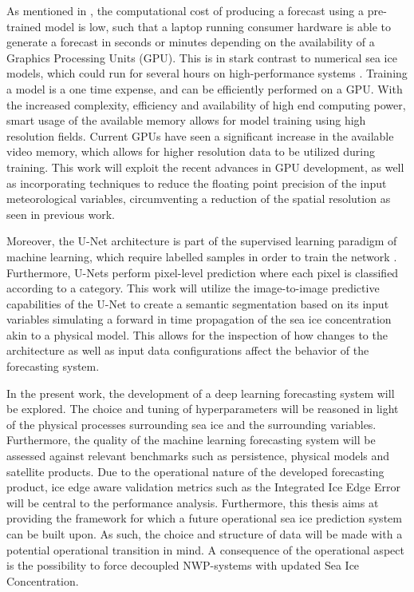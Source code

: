 \documentclass[../main/thesis.tex]{subfiles}
\begin{document}
As mentioned in \cite{Andersson2021, Fritzner2020}, the computational cost of producing a forecast using a pre-trained model is low, such that a laptop running consumer hardware is able to generate a forecast in seconds or minutes depending on the availability of a Graphics Processing Units (GPU). This is in stark contrast to numerical sea ice models, which could run for several hours on high-performance systems \cite{Andersson2021}. Training a model is a one time expense, and can be efficiently performed on a GPU. With the increased complexity, efficiency and availability of high end computing power, smart usage of the available memory allows for model training using high resolution fields. Current GPUs have seen a significant increase in the available video memory, which allows for higher resolution data to be utilized during training. This work will exploit the recent advances in GPU development, as well as incorporating techniques to reduce the floating point precision of the input meteorological variables, circumventing a reduction of the spatial resolution as seen in previous work.

Moreover, the U-Net architecture is part of the supervised learning paradigm of machine learning, which require labelled samples in order to train the network \cite{Ronneberger2015}. Furthermore, U-Nets perform pixel-level prediction where each pixel is classified according to a category. This work will utilize the image-to-image predictive capabilities of the U-Net to create a semantic segmentation based on its input variables simulating a forward in time propagation of the sea ice concentration akin to a physical model. This allows for the inspection of how changes to the architecture as well as input data configurations affect the behavior of the forecasting system. 

In the present work, the development of a deep learning forecasting system will be explored. The choice and tuning of hyperparameters will be reasoned in light of the physical processes surrounding sea ice and the surrounding variables. Furthermore, the quality of the machine learning forecasting system will be assessed against relevant benchmarks such as persistence, physical models and satellite products. Due to the operational nature of the developed forecasting product, ice edge aware validation metrics such as the Integrated Ice Edge Error \cite{Goessling2016} will be central to the performance analysis. Furthermore, this thesis aims at providing the framework for which a future operational sea ice prediction system can be built upon. As such, the choice and structure of data will be made with a potential operational transition in mind. A consequence of the operational aspect is the possibility to force decoupled NWP-systems with updated Sea Ice Concentration.
\end{document}
